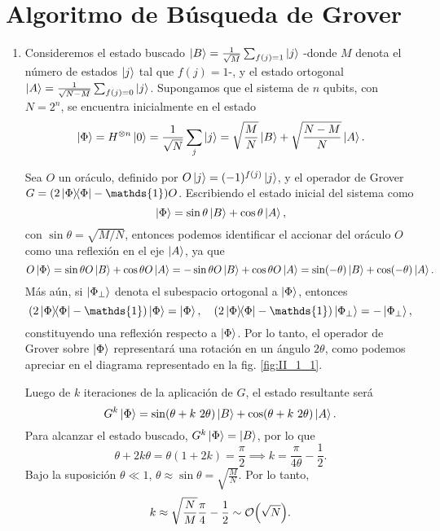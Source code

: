 \documentclass{scrartcl}
\newcommand{\inv}[1]{\frac{1}{#1}}
\DeclareRobustCommand{\[}{\begin{equation}}
\DeclareRobustCommand{\]}{\end{equation}}
\begin{document}
\section{Algoritmo de Búsqueda de Grover}
\begin{enumerate}
    
    \item Consideremos el estado buscado $\ket{B} = \inv{\sqrt{M}} \sum_{f(j) = 1} \ket{j}$ -donde $M$ denota el número de estados $\ket{j}$ tal que $f(j) = 1$-, y el estado ortogonal $\ket{A} = \inv{\sqrt{N - M}} \sum_{f(j) = 0} \ket{j}$. Supongamos que el sistema de $n$ qubits, con $N = 2^n$, se encuentra inicialmente en el estado
    \[ \ket{\Phi} = H^{\otimes n} \ket{0} = \inv{\sqrt{N}} \sum_{j} \ket{j} = \sqrt{\frac{M}{N}} \ket{B} + \sqrt{\frac{N - M}{N}} \ket{A}. \]
    
    Sea $O$ un oráculo, definido por $O \ket{j} = (-1)^{f(j)} \ket{j}$, y el operador de Grover $G = (2 \dyad{\Phi}{\Phi} - \mathds{1}) O$. Escribiendo el estado inicial del sistema como
    \[ \ket{\Phi} = \sin\theta \ket{B} + \cos\theta \ket{A}, \]
    con $\sin\theta = \sqrt{M/N}$, entonces podemos identificar el accionar del oráculo $O$ como una reflexión en el eje $\ket{A}$, ya que
    \[ O \ket{\Phi} = \sin\theta O \ket{B} + \cos\theta O \ket{A} = -\sin\theta O \ket{B} + \cos\theta O \ket{A} = \sin(-\theta) \ket{B} + \cos(-\theta) \ket{A}. \]
    Más aún, si $\ket{\Phi_\perp}$ denota el subespacio ortogonal a $\ket{\Phi}$, entonces
    \[ (2\dyad{\Phi}{\Phi} - \mathds{1}) \ket{\Phi} = \ket{\Phi}, \quad (2\dyad{\Phi}{\Phi} - \mathds{1}) \ket{\Phi_\perp} = -\ket{\Phi_\perp}, \]
    constituyendo una reflexión respecto a $\ket{\Phi}$. Por lo tanto, el operador de Grover sobre $\ket{\Phi}$ representará una rotación en un ángulo $2\theta$, como podemos apreciar en el diagrama representado en la fig. \ref{fig:II_1_1}.
    
    Luego de $k$ iteraciones de la aplicación de $G$, el estado resultante será
    \[ G^k \ket{\Phi} = \sin(\theta + k \ 2\theta) \ket{B} + \cos(\theta + k \ 2\theta) \ket{A}. \]
    Para alcanzar el estado buscado, $G^k\ket{\Phi} = \ket{B}$, por lo que
    \[ \theta + 2k\theta = \theta (1 + 2k) = \frac{\pi}{2} \implies k = \frac{\pi}{4\theta} - \inv{2}. \]
    Bajo la suposición $\theta \ll 1$, $\theta \approx \sin\theta = \sqrt{\frac{M}{N}}$. Por lo tanto,
    \[ k \approx \sqrt{\frac{N}{M}} \frac{\pi}{4} - \inv{2} \sim \order{\sqrt{N}}. \]
    

\end{enumerate}
\end{document}
